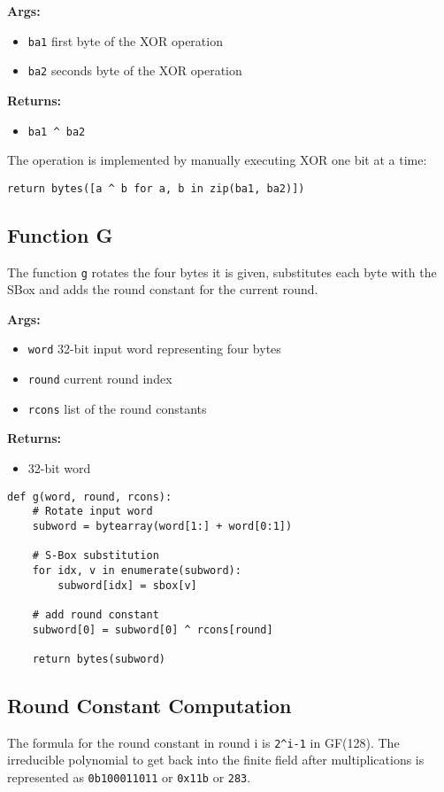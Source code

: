 \textbf{Args:}
\begin{itemize}
  \item \lstinline{ba1} first byte of the XOR operation
  \item \lstinline{ba2} seconds byte of the XOR operation
\end{itemize}

\textbf{Returns:}
\begin{itemize}
  \item \lstinline{ba1 ^ ba2}
\end{itemize}

The operation is implemented by manually executing XOR one bit at a time:
\begin{lstlisting}
return bytes([a ^ b for a, b in zip(ba1, ba2)])
\end{lstlisting}


\subsection{Function G}
\label{ch:func_g}

The function \lstinline{g} rotates the four bytes it is given, substitutes each byte with the SBox and adds the round constant for the current round.

\textbf{Args:}
\begin{itemize}
  \item \lstinline{word} 32-bit input word representing four bytes
  \item \lstinline{round} current round index
  \item \lstinline{rcons} list of the round constants
\end{itemize}

\textbf{Returns:}
\begin{itemize}
  \item 32-bit word
\end{itemize}

\begin{lstlisting}
def g(word, round, rcons):
    # Rotate input word
    subword = bytearray(word[1:] + word[0:1])

    # S-Box substitution
    for idx, v in enumerate(subword):
        subword[idx] = sbox[v]

    # add round constant
    subword[0] = subword[0] ^ rcons[round]

    return bytes(subword)
\end{lstlisting}


\subsection{Round Constant Computation}
The formula for the round constant in round i is  \lstinline{2^i-1} in GF(128). The irreducible polynomial to get back into the finite field after multiplications is represented as  \lstinline{0b100011011} or  \lstinline{0x11b} or  \lstinline{283}.

